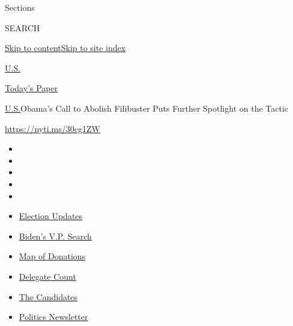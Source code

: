 Sections

SEARCH

\protect\hyperlink{site-content}{Skip to
content}\protect\hyperlink{site-index}{Skip to site index}

\href{https://www.nytimes.com/section/us}{U.S.}

\href{https://myaccount.nytimes.com/auth/login?response_type=cookie\&client_id=vi}{}

\href{https://www.nytimes.com/section/todayspaper}{Today's Paper}

\href{/section/us}{U.S.}\textbar{}Obama's Call to Abolish Filibuster
Puts Further Spotlight on the Tactic

\url{https://nyti.ms/30cg1ZW}

\begin{itemize}
\item
\item
\item
\item
\item
\end{itemize}

\begin{itemize}
\item
  \href{https://www.nytimes.com/2020/07/31/us/elections/biden-vs-trump.html?action=click\&pgtype=Article\&state=default\&region=TOP_BANNER\&context=storylines_menu}{Election
  Updates}
\item
  \href{https://www.nytimes.com/article/biden-vice-president-2020.html?action=click\&pgtype=Article\&state=default\&region=TOP_BANNER\&context=storylines_menu}{Biden's
  V.P. Search}
\item
  \href{https://www.nytimes.com/interactive/2020/07/24/us/politics/trump-biden-campaign-donors.html?action=click\&pgtype=Article\&state=default\&region=TOP_BANNER\&context=storylines_menu}{Map
  of Donations}
\item
  \href{https://www.nytimes.com/interactive/2020/us/elections/delegate-count-primary-results.html?action=click\&pgtype=Article\&state=default\&region=TOP_BANNER\&context=storylines_menu}{Delegate
  Count}
\item
  \href{https://www.nytimes.com/interactive/2019/us/politics/2020-presidential-candidates.html?action=click\&pgtype=Article\&state=default\&region=TOP_BANNER\&context=storylines_menu}{The
  Candidates}
\item
  \href{https://www.nytimes.com/newsletters/politics?action=click\&pgtype=Article\&state=default\&region=TOP_BANNER\&context=storylines_menu}{Politics
  Newsletter}
\end{itemize}

